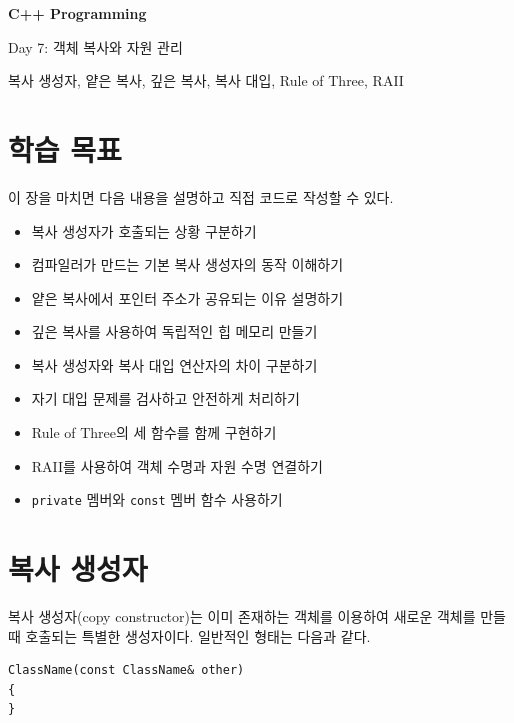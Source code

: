 \documentclass[11pt,a4paper]{article}
\begin{document}
\begin{titlepage}
    \centering
    \vspace*{3cm}
    {\Huge\bfseries C++ Programming\par}
    \vspace{0.8cm}
    {\LARGE Day 7: 객체 복사와 자원 관리\par}
    \vspace{2cm}
    {\large 복사 생성자, 얕은 복사, 깊은 복사, 복사 대입, Rule of Three, RAII\par}
    \vfill
\end{titlepage}

\tableofcontents
\newpage

\section{학습 목표}
\begin{learningbox}
이 장을 마치면 다음 내용을 설명하고 직접 코드로 작성할 수 있다.
\begin{itemize}[leftmargin=1.5em]
    \item 복사 생성자가 호출되는 상황 구분하기
    \item 컴파일러가 만드는 기본 복사 생성자의 동작 이해하기
    \item 얕은 복사에서 포인터 주소가 공유되는 이유 설명하기
    \item 깊은 복사를 사용하여 독립적인 힙 메모리 만들기
    \item 복사 생성자와 복사 대입 연산자의 차이 구분하기
    \item 자기 대입 문제를 검사하고 안전하게 처리하기
    \item Rule of Three의 세 함수를 함께 구현하기
    \item RAII를 사용하여 객체 수명과 자원 수명 연결하기
    \item \texttt{private} 멤버와 \texttt{const} 멤버 함수 사용하기
\end{itemize}
\end{learningbox}

\section{복사 생성자}
복사 생성자(copy constructor)는 이미 존재하는 객체를 이용하여 새로운 객체를 만들 때 호출되는 특별한 생성자이다. 일반적인 형태는 다음과 같다.

\begin{lstlisting}
ClassName(const ClassName& other)
{
}
\end{lstlisting}
\end{document}
